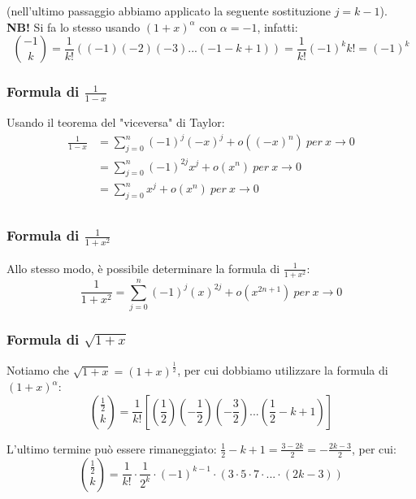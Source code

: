 \documentclass{article}
\begin{document}
\noindent (nell'ultimo passaggio abbiamo applicato la seguente sostituzione $j = k - 1$). \\

\noindent\textbf{NB!} Si fa lo stesso usando $(1 + x)^\alpha$ con $\alpha = -1$, infatti:
\begin{equation*}
    \binom{-1}{k} = \frac{1}{k!}((-1)(-2)(-3)...(-1 - k + 1)) = \frac{1}{k!} (-1)^k k! = (-1)^k
\end{equation*}

\subsubsection{Formula di $\frac{1}{1 - x}$}
Usando il teorema del "viceversa" di Taylor: 
\begin{align*}
    \frac{1}{1 - x} &= \sum_{j = 0}^n (-1)^j (-x)^j + o((-x)^n) \ per \ x \to 0 \\
    &= \sum_{j = 0}^n (-1)^{2j}x^j + o(x^n) \ per \ x \to 0 \\
    &= \sum_{j = 0}^n x^j + o(x^n) \ per \ x \to 0 \\
\end{align*}

\subsubsection{Formula di $\frac{1}{1 + x^2}$}
Allo stesso modo, è possibile determinare la formula di $\frac{1}{1 + x^2}$:
\begin{equation*}
    \frac{1}{1 + x^2} = \sum_{j = 0}^n (-1)^j (x)^{2j} + o(x^{2n + 1}) \ per \ x \to 0
\end{equation*}

\subsubsection{Formula di $\sqrt{1 + x}$}
Notiamo che $\sqrt{1 + x} = (1 + x)^\frac{1}{2}$, per cui dobbiamo utilizzare la formula di $(1 + x)^\alpha$:
\begin{equation*}
    \binom{\frac{1}{2}}{k} = \frac{1}{k!}\left[\left(\frac{1}{2}\right)\left(-\frac{1}{2}\right)\left(-\frac{3}{2}\right)...\left(\frac{1}{2} - k + 1\right)\right]
\end{equation*}

\noindent L'ultimo termine può essere rimaneggiato: $\frac{1}{2} - k + 1 = \frac{3 - 2k}{2} = - \frac{2k - 3}{2}$, per cui:
\begin{equation*}
    \binom{\frac{1}{2}}{k} = \frac{1}{k!} \cdot \frac{1}{2^k} \cdot (-1)^{k - 1} \cdot (3 \cdot 5 \cdot 7 \cdot ... \cdot (2k - 3))
\end{equation*}
\end{document}
